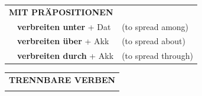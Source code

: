 \documentclass[10pt,a4paper]{revtex4-2}
\begin{document}
\begin{verbbox}
\vspace{10pt}

\begin{tabular}{lll}
\multicolumn{3}{l}{\textbf{MIT PRÄPOSITIONEN}}\\
& \textbf{verbreiten unter} + Dat & (to spread among)\\
& \textbf{verbreiten über} + Akk & (to spread about)\\
& \textbf{verbreiten durch} + Akk & (to spread through)\\
\end{tabular}
\hfill
\begin{tabular}{lll}
\multicolumn{3}{l}{\textbf{TRENNBARE VERBEN}}\\
\vspace{30pt}\end{tabular}
\vspace{-5pt}
\end{verbbox}
\end{document}
